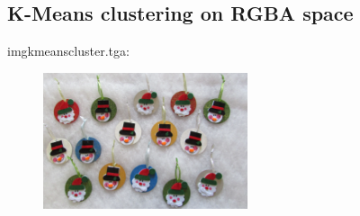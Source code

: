 \subsection{K-Means clustering on RGBA space}

imgkmeanscluster.tga:\\
\begin{center}
\begin{figure}[H]
\centering\includegraphics[width=6cm]{./imgkmeanscluster.png}\\
\end{figure}
\end{center}

